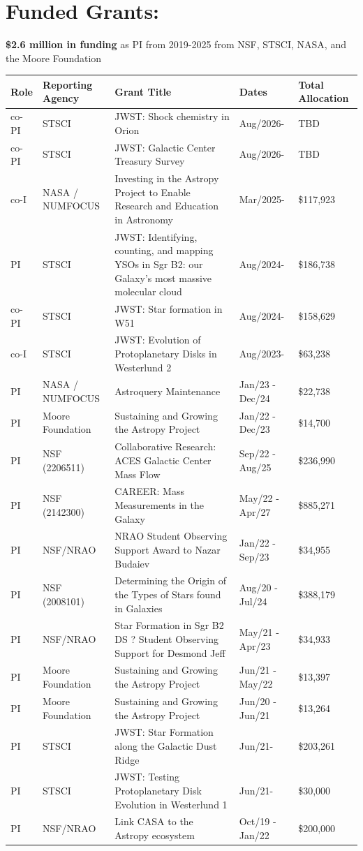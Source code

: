 \begin{minipage}{\textwidth}
\section*{Funded Grants: }


    \textbf{\$2.6 million in funding} as PI from 2019-2025 from NSF, STSCI, NASA, and the Moore Foundation \\

\begin{tabular}{lp{1.0in}p{2.5in}p{0.6in}p{0.6in}}
Role & Reporting Agency & Grant Title & Dates & Total \mbox{Allocation}  \\
\hline
co-PI & STSCI & JWST: Shock chemistry in Orion & Aug/2026- & TBD \\
co-PI & STSCI & JWST: Galactic Center Treasury Survey & Aug/2026- & TBD \\
co-I & NASA / NUMFOCUS & Investing in the Astropy Project to Enable Research and Education in Astronomy & Mar/2025- & \$117,923 \\
PI & STSCI & JWST: Identifying, counting, and mapping YSOs in Sgr B2: our Galaxy's most massive molecular cloud	 & Aug/2024- &  \$186,738 \\
co-PI & STSCI & JWST: Star formation in W51 & Aug/2024- &  \$158,629 \\
co-I & STSCI & JWST: Evolution of Protoplanetary Disks in Westerlund 2 & Aug/2023- &  \$63,238 \\
PI & NASA / NUMFOCUS & Astroquery Maintenance & Jan/23 - Dec/24 & \$22,738   \\
PI & Moore Foundation & Sustaining and Growing the Astropy Project & Jan/22 - Dec/23 & \$14,700   \\
PI & NSF (2206511) & Collaborative Research: ACES Galactic Center Mass Flow & Sep/22 - Aug/25 & \$236,990 \\
PI & NSF (2142300) & CAREER: Mass Measurements in the Galaxy  & May/22 - Apr/27 & \$885,271  \\
PI & NSF/NRAO & NRAO Student Observing Support Award to Nazar Budaiev  & Jan/22 - Sep/23 & \$34,955  \\
PI & NSF (2008101) & Determining the Origin of the Types of Stars found in Galaxies  & Aug/20 - Jul/24 & \$388,179  \\
PI & NSF/NRAO & Star Formation in Sgr B2 DS ? Student Observing Support for Desmond Jeff  & May/21 - Apr/23 & \$34,933   \\
PI & Moore Foundation & Sustaining and Growing the Astropy Project  & Jun/21 - May/22 & \$13,397   \\
PI & Moore Foundation & Sustaining and Growing the Astropy Project  & Jun/20 - Jun/21 & \$13,264   \\
PI & STSCI & JWST: Star Formation along the Galactic Dust Ridge & Jun/21- &  \$203,261 \\
PI & STSCI & JWST: Testing Protoplanetary Disk Evolution in Westerlund 1 & Jun/21- &  \$30,000 \\
PI & NSF/NRAO & Link CASA to the Astropy ecosystem  & Oct/19 - Jan/22 & \$200,000   \\
\end{tabular}
\end{minipage}
\vspace{4mm}
